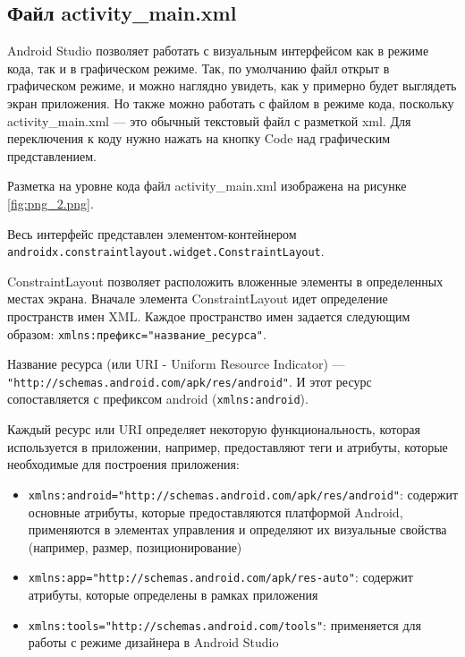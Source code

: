 \subsection{Файл activity\_main.xml}
Android Studio позволяет работать с визуальным интерфейсом как в режиме
кода, так и в графическом режиме. Так, по умолчанию файл открыт в
графическом режиме, и можно наглядно увидеть, как у примерно
будет выглядеть экран приложения.
Но также можно работать с файлом в режиме кода, поскольку
activity\_main.xml --- это обычный текстовый файл с разметкой xml. Для
переключения к коду нужно нажать на кнопку Code над графическим
представлением.\par
Разметка на уровне кода файл activity\_main.xml изображена
на рисунке \ref{fig:png_2.png}.

Весь интерфейс представлен элементом-контейнером
\texttt{androidx.constraintlayout.widget.ConstraintLayout}.\par
ConstraintLayout позволяет расположить вложенные элементы в
определенных местах экрана. Вначале элемента ConstraintLayout идет
определение пространств имен XML.
Каждое пространство имен задается следующим образом:
\texttt{xmlns:префикс="название\_ресурса"}.\par
Название ресурса (или URI - Uniform Resource Indicator) ---
\texttt{"http://schemas.android.com/apk/res/android"}.
И этот ресурс сопоставляется с префиксом android (\texttt{xmlns:android}).\par
Каждый ресурс или URI определяет некоторую функциональность,
которая используется в приложении, например, предоставляют теги и атрибуты,
которые необходимые для построения приложения:
\begin{itemize}
	\item \texttt{xmlns:android="http://schemas.android.com/apk/res/android"}:
		содержит основные атрибуты, которые предоставляются платформой
		Android, применяются в элементах управления и определяют
		их визуальные свойства (например, размер, позиционирование)
	\item \texttt{xmlns:app="http://schemas.android.com/apk/res-auto"}:
		содержит атрибуты, которые определены в рамках приложения
	\item \texttt{xmlns:tools="http://schemas.android.com/tools"}:
		применяется для работы с режиме дизайнера в Android Studio
\end{itemize}

